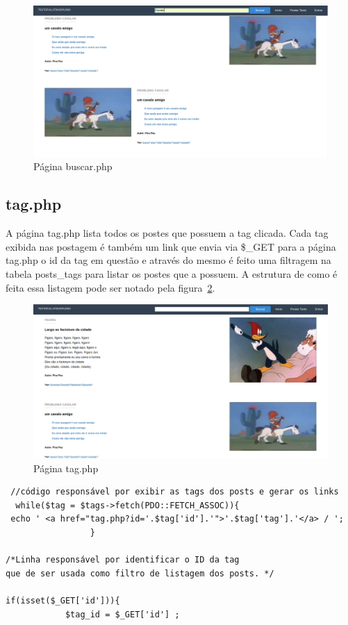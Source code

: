 \documentclass[
	article,			%
	11pt,				%
	oneside,			%
	a4paper,			%
	english,			%
	brazil,				%
	sumario=tradicional
	]{abntex2}
\begin{document}
\begin{figure} [h!]
  \centering
    \caption{Página buscar.php}
  \label{buscar}
    \includegraphics[scale=0.3]{buscar.png}
       
\end{figure} 

\subsection{tag.php} 


A página tag.php lista todos os postes que possuem a tag clicada.  Cada tag exibida nas postagem é também um link que envia via \$\_GET para a página tag.php o id da tag em questão e através do mesmo é feito uma filtragem na tabela posts\_tags  para listar os postes que a possuem. A estrutura de como é feita essa listagem pode ser notado pela figura~\ref{tag}. 


\begin{figure} [h!]
  \centering
    \caption{Página tag.php}
  \label{tag}
    \includegraphics[scale=0.3]{tag.png}
       
\end{figure} 

\begin{verbatim}
 //código responsável por exibir as tags dos posts e gerar os links
  while($tag = $tags->fetch(PDO::FETCH_ASSOC)){
 echo ' <a href="tag.php?id='.$tag['id'].'">'.$tag['tag'].'</a> / '; 
                 }
                 
/*Linha responsável por identificar o ID da tag 
que de ser usada como filtro de listagem dos posts. */

if(isset($_GET['id'])){
            $tag_id = $_GET['id'] ;


\end{verbatim}
\end{document}
